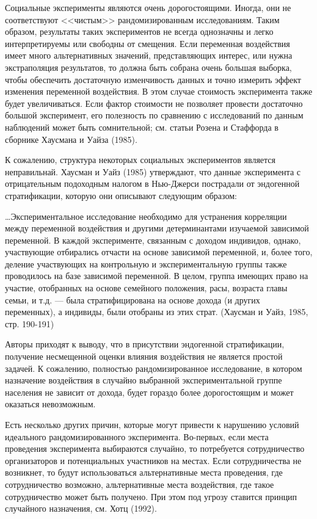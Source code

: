 Социальные эксперименты являются очень дорогостоящими. Иногда, они не соответствуют <<чистым>> рандомизированным  исследованиям. Таким образом, результаты таких экспериментов не всегда однозначны и легко интерпретируемы или свободны от смещения. Если  переменная воздействия имеет много альтернативных значений, представляющих интерес, или нужна экстраполяция результатов, то должна быть собрана очень большая выборка, чтобы обеспечить достаточную изменчивость данных и точно измерить эффект изменения переменной воздействия. В этом случае стоимость эксперимента также будет увеличиваться. Если фактор стоимости не позволяет провести достаточно большой эксперимент, его полезность по сравнению с исследований по данным наблюдений может быть сомнительной; см. статьи Розена и Стаффорда в сборнике Хаусмана и Уайза (1985).


К сожалению, структура некоторых социальных экспериментов является неправильнай. Хаусман и Уайз (1985) утверждают, что данные эксперимента с отрицательным подоходным налогом в Нью-Джерси пострадали от эндогенной стратификации, которую они описывают следующим образом:

\ldots Экспериментальное исследование необходимо для устранения корреляции между переменной воздействия и другими детерминантами изучаемой зависимой переменной. В каждой эксперименте, связанным с доходом индивидов, однако, участвующие отбирались  отчасти на основе зависимой переменной, и, более того, деление участвующих на контрольную и экспериментальную группы также проводилось на базе зависимой переменной.  В целом, группа имеющих право на участие, отобранных на основе семейного положения, расы, возраста главы семьи, и т.д. --- была стратифицирована на основе дохода (и других переменных), а индивиды, были отобраны из этих страт. (Хаусман и Уайз, 1985, стр. 190-191)


Авторы приходят к выводу, что в присутствии эндогенной стратификации, получение несмещенной оценки влияния воздействия не является простой задачей.  К сожалению, полностью рандомизированное исследование, в котором назначение воздействия в случайно выбранной экспериментальной группе населения не зависит от дохода, будет гораздо более дорогостоящим и может оказаться невозможным.



Есть несколько других причин, которые могут привести к нарушению условий идеального рандомизированного эксперимента. Во-первых, если места проведения эксперимента выбираются случайно, то потребуется сотрудничество организаторов и потенциальных участников на местах. Если сотрудничества не возникнет, то будут использоваться альтернативные места проведения, где сотрудничество возможно,  альтернативные места воздействия, где такое сотрудничество может быть получено. При этом под  угрозу ставится принцип случайного назначения, см. Хотц (1992).



